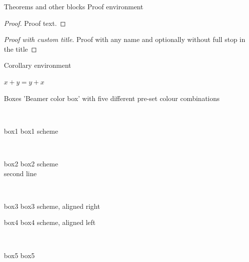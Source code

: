 \documentclass[11pt,t]{beamer}
\begin{document}
\begin{frame}{Theorems and other blocks}
Proof environment
	\begin{proof}
	Proof text.
	\end{proof}
	
	\begin{proof}[Proof with custom title\nopunct]
	Proof with any name and optionally without full stop in the title
	\end{proof}

\vspace{11pt}	
Corollary environment
	\begin{corollary}
	$ x + y = y + x  $
	\end{corollary}
\end{frame}




\begin{frame}{Boxes}
'Beamer color box' with five different pre-set colour combinations
	\begin{center}~
		\begin{beamercolorbox}[wd=.7\textwidth,sep=4pt,center]{box1}
		box1 scheme
		\end{beamercolorbox}
	\end{center}
	
	\begin{center}~
		\begin{beamercolorbox}[wd=.7\textwidth,sep=4pt,center]{box2}	
		box2 scheme  \\
				second line
		\end{beamercolorbox}
	\end{center}
	
	\begin{center}~
		\begin{beamercolorbox}[wd=0.3\textwidth,sep=4pt,right]{box3}
		box3 scheme, aligned right
		\end{beamercolorbox}
	\hspace{11pt}
		\begin{beamercolorbox}[wd=0.3\textwidth,sep=4pt]{box4}		
		box4 scheme, aligned left
		\end{beamercolorbox}
	\end{center}
	
	\begin{center}~
		\begin{beamercolorbox}[wd=2cm,ht=1.5cm,sep=4pt,center]{box5}
		box5
		\\
		 \
		\end{beamercolorbox}
	\end{center}

\end{frame}
\end{document}
